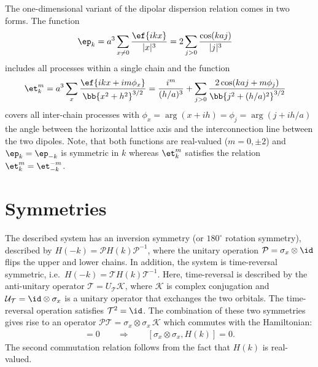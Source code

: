 The one-dimensional variant of the dipolar dispersion relation comes in two forms. The function
\begin{align}
    \ep_k &= a^3 \sum_{x\ne 0} \frac{\ef{i k x}}{|x|^3} = 2 \sum_{j>0} \frac{\cos(k a j)}{|j|^3}
\end{align}
includes all processes within a single chain and the function
\begin{align}
    \et^m_k &= a^3 \sum_{x} \frac{\ef{i k x + i m \phi_x}}{\bb{x^2 + h^2}^{3/2}}
    = \frac{i^m}{(h/a)^3} + \sum_{j>0} \frac{2\cos(ka j+m\phi_j)}{\bb{j^2+(h/a)^2}^{3/2}}
\end{align}
covers all inter-chain processes with $\phi_x = \arg(x+ i h)=\phi_j=\arg(j+ i h/a)$ the angle between the horizontal lattice axis and the interconnection line between the two dipoles.
Note, that both functions are real-valued ($m = 0, \pm 2$) and $\ep_k=\ep_{-k}$ is symmetric in $k$ whereas $\et^m_k$ satisfies the relation $\et^m_k=\et^{-m}_{-k}$.

\section{Symmetries}
The described system has an inversion symmetry (or $180^\circ$ rotation symmetry), described by $H(-k) = \mathcal{P} H(k) \mathcal{P}^{-1}$, where the unitary operation $\mathcal{P} = \sigma_x \otimes \id$ flips the upper and lower chains.
In addition, the system is time-reversal symmetric, i.e.~$H(-k)=\mathcal{T} H(k) \mathcal{T}^{-1}$.
Here, time-reversal is described by the anti-unitary operator $\mathcal{T}=U_\mathcal{T} \mathcal{K}$, where $\mathcal{K}$ is complex conjugation and $\mathcal{U}_\mathcal{T} = \id \otimes \sigma_x$ is a unitary operator that exchanges the two orbitals.
The time-reversal operation satisfies $\mathcal{T}^2 = \id$.
The combination of these two symmetries gives rise to an operator $\mathcal{P}\mathcal{T} = \sigma_x \otimes \sigma_x \, \mathcal{K}$ which commutes with the Hamiltonian:
\begin{align}
    [\mathcal{P}\mathcal{T}, H(k)] = 0\qquad \Rightarrow \qquad [\sigma_x \otimes \sigma_x, H(k)]= 0.
\end{align}
The second commutation relation follows from the fact that $H(k)$ is real-valued.


